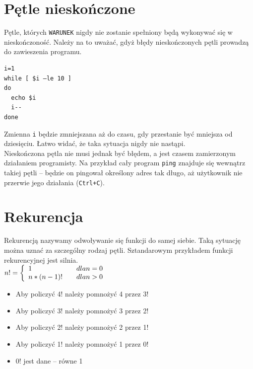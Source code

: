 \section{Pętle nieskończone}
Pętle, których \texttt{WARUNEK} nigdy nie zostanie spełniony będą wykonywać się w nieskończoność. Należy na to uważać, gdyż błędy nieskończonych pętli prowadzą do zawieszenia programu. 
\begin{verbatim}
i=1	
while [ $i –le 10 ]	
do	
  echo $i	
  i--	
done
\end{verbatim}
Zmienna \texttt{i} będzie zmniejszana aż do czasu, gdy przestanie być mniejsza od dziesięciu. Łatwo widać, że taka sytuacja nigdy nie nastąpi.\\

Nieskończona pętla nie musi jednak być błędem, a jest czasem zamierzonym działaniem programisty. Na przykład cały program \texttt{ping} znajduje się wewnątrz takiej pętli – będzie on pingował określony adres tak długo, aż użytkownik nie przerwie jego działania (\texttt{Ctrl+C}).

\section{Rekurencja}
Rekurencją nazywamy odwoływanie się funkcji do samej siebie. Taką sytuację można uznać za szczególny rodzaj pętli. Sztandarowym przykładem funkcji rekurencyjnej jest silnia.\\

\begin{math}
n! = \left\{
\begin{array}{l l}
1 & \quad dla n = 0 \\
n\ast(n-1)! & \quad dla n > 0 \\
\end{array}
\right.
\end{math}\\

\begin{itemize}
\item[] Aby policzyć 4! należy pomnożyć 4 przez 3!
\item[] Aby policzyć 3! należy pomnożyć 3 przez 2!
\item[] Aby policzyć 2! należy pomnożyć 2 przez 1!
\item[] Aby policzyć 1! należy pomnożyć 1 przez 0!
\item[] 0! jest dane – równe 1
\end{itemize}
